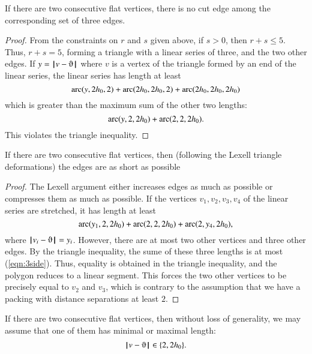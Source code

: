 \begin{lemma}
If there are two consecutive flat vertices, there is no cut edge among the corresponding set of three edges.
\end{lemma}

\begin{proof}  From the constraints on $r$ and $s$ given above, if $s>0$, then $r+s\le 5$.  Thus, $r+s=5$, forming a triangle with a linear series of three, and the two other edges.  If $y=\norm{v}{\orgn}$ where $v$ is a vertex of the triangle formed by an end of the linear series, the linear series has length at least
$$
\operatorname{arc}(y,2{h_0},2)+\operatorname{arc}(2{h_0},2{h_0},2) +\operatorname{arc}(2{h_0},2{h_0},2{h_0})
$$
which is greater than the maximum sum of the other two lengths:
$$
\operatorname{arc}(y,2,2{h_0})+\operatorname{arc}(2,2,2{h_0}).
$$
This violates the triangle inequality.
\end{proof}

\begin{lemma}  If there are two consecutive flat vertices, then (following the Lexell triangle deformations) the edges are as short as possible
\end{lemma}

\begin{proof} The Lexell argument either increases edges as much as possible or compresses them as much as possible.  If the vertices $v_1,v_2,v_3,v_4$ of the linear series are stretched, it has length at least
\begin{equation}\label{eqn:3side}
\operatorname{arc}(y_1,2,2{h_0})+\operatorname{arc}(2,2,2{h_0})+\operatorname{arc}(2,y_4,2{h_0}),
\end{equation}
where $\norm{v_i}{\orgn}=y_i$.
However, there are at most two other vertices and three other edges.  By the triangle inequality, the sume of these three lengths is at most (\ref{eqn:3side}).
Thus, equality is obtained in the triangle inequality, and the polygon reduces to a linear segment.  This forces the two other vertices to be precisely equal to $v_2$ and $v_3$, which is contrary to the assumption that we have a packing with distance separations at least $2$.
\end{proof}

\begin{lemma} If there are two consecutive flat vertices, then without loss of generality, we may assume that one of them has minimal or maximal length:
$$\norm{v}{\orgn}\in \{2,2\hm\}.$$
\end{lemma}

